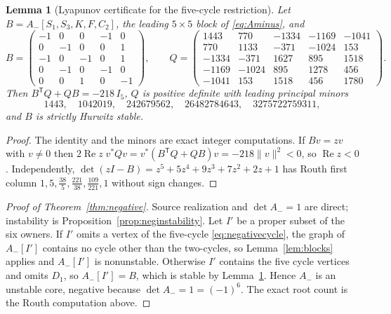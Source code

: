 \documentclass[11pt,a4paper]{article}
\theoremstyle{plain}
\newtheorem{lemma}[theorem]{Lemma}
\theoremstyle{definition}
\theoremstyle{remark}
\newcommand{\Aminus}{A_{-}}
\newcommand{\T}{\mathsf T}
\DeclareMathOperator{\Ree}{Re}
\begin{document}
\begin{lemma}[Lyapunov certificate for the five-cycle restriction]\label{lem:lyapunov}
Let $B=\Aminus[S_1,S_3,K,F,C_2]$, the leading $5\times5$ block of \eqref{eq:Aminus}, and
\begin{equation}\label{eq:BQ}
B=\begin{pmatrix}
-1&0&0&-1&0\\0&-1&0&0&1\\-1&0&-1&0&1\\0&-1&0&-1&0\\0&0&1&0&-1
\end{pmatrix},\qquad
Q=\begin{pmatrix}
1443&770&-1334&-1169&-1041\\
770&1133&-371&-1024&153\\
-1334&-371&1627&895&1518\\
-1169&-1024&895&1278&456\\
-1041&153&1518&456&1780
\end{pmatrix}.
\end{equation}
Then $B^{\T}Q+QB=-218\,I_5$, $Q$ is positive definite with leading principal minors
\begin{equation}\label{eq:Qminors}
1443,\quad 1042019,\quad 242679562,\quad 26482784643,\quad 3275722759311,
\end{equation}
and $B$ is strictly Hurwitz stable.
\end{lemma}
\begin{proof}
The identity and the minors are exact integer computations. If $Bv=zv$ with $v\neq0$ then $2\Ree z\;v^*Qv=v^*(B^{\T}Q+QB)v=-218\|v\|^2<0$, so $\Ree z<0$. Independently, $\det(zI-B)=z^5+5z^4+9z^3+7z^2+2z+1$ has Routh first column $1,5,\tfrac{38}{5},\tfrac{221}{38},\tfrac{109}{221},1$ without sign changes.
\end{proof}

\begin{proof}[Proof of Theorem~\ref{thm:negative}]
Source realization and $\det\Aminus=1$ are direct; instability is Proposition~\ref{prop:neginstability}. Let $I'$ be a proper subset of the six owners. If $I'$ omits a vertex of the five-cycle \eqref{eq:negativecycle}, the graph of $\Aminus[I']$ contains no cycle other than the two-cycles, so Lemma~\ref{lem:blocks} applies and $\Aminus[I']$ is nonunstable. Otherwise $I'$ contains the five cycle vertices and omits $D_1$, so $\Aminus[I']=B$, which is stable by Lemma~\ref{lem:lyapunov}. Hence $\Aminus$ is an unstable core, negative because $\det\Aminus=1=(-1)^6$. The exact root count is the Routh computation above.
\end{proof}
\end{document}
